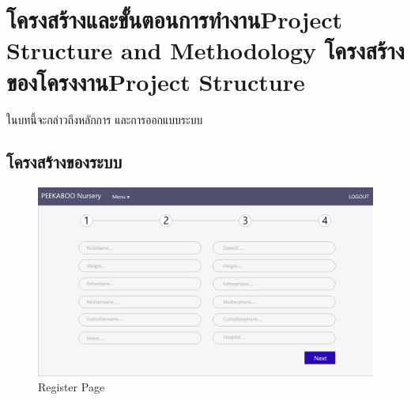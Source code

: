 \chapter{\ifproject%
\ifcpe โครงสร้างและขั้นตอนการทำงาน\else Project Structure and Methodology\fi
\else%
\ifcpe โครงสร้างของโครงงาน\else Project Structure\fi
\fi
}

ในบทนี้จะกล่าวถึงหลักการ และการออกแบบระบบ

\makeatletter


\makeatother



\section{โครงสร้างของระบบ}

\begin{figure}
  \begin{center}
  \includegraphics[width=140mm]{images/registerPage.png}
  \end{center}
  \caption[Poem]{Register Page}
  \label{fig:register}
  \end{figure}

